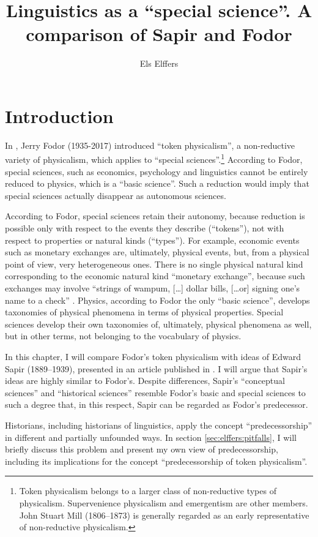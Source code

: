 \documentclass[output=paper]{langscibook}
\author{Els Elffers}
\title{Linguistics as a ``special science''. A comparison of Sapir and Fodor}
\begin{document}
\section{Introduction} 
\label{sec:elffers:intro}
In \citeyear{Fodor1974}, Jerry Fodor (1935-2017) introduced ``token physicalism'', a non-reductive variety of physicalism, which applies to ``special sciences''.\footnote{Token physicalism belongs to a larger class of non-reductive types of physicalism. Supervenience physicalism and emergentism are other members. John Stuart Mill (1806–1873) is generally regarded as an early representative of non-reductive physicalism.} According to Fodor, special sciences, such as economics, psychology and linguistics cannot be entirely reduced to physics, which is a ``basic science''. Such a reduction would imply that special sciences actually disappear as autonomous sciences. 

According to Fodor, special sciences retain their autonomy, because reduction is possible only with respect to the events they describe (``tokens''), not with respect to properties or natural kinds (``types''). For example, economic events such as monetary exchanges are, ultimately, physical events, but, from a physical point of view, very heterogeneous ones. There is no single physical natural kind corresponding to the economic natural kind ``monetary exchange'', because such exchanges may involve ``strings of wampum, […] dollar bills, […or] signing one's name to a check'' \citep[103]{Fodor1974}. Physics, according to Fodor the only ``basic science'', develops taxonomies of physical phenomena in terms of physical properties. Special sciences develop their own taxonomies of, ultimately, physical phenomena as well, but in other terms, not belonging to the vocabulary of physics.

In this chapter, I will compare Fodor's token physicalism with ideas of Edward Sapir (1889–1939), presented in an article published in \citeyear{Sapir1917}. I will argue that Sapir's ideas are highly similar to Fodor's. Despite differences, Sapir's ``conceptual sciences'' and ``historical sciences'' resemble Fodor's basic and special sciences to such a degree that, in this respect, Sapir can be regarded as Fodor's predecessor.\label{q:elffers:probsols}

Historians, including historians of linguistics, apply the concept ``predecessorship'' in different and partially unfounded ways. In section \ref{sec:elffers:pitfalls}, I will briefly discuss this problem and present my own view of predecessorship, including its implications for the concept ``predecessorship of token physicalism''.
\end{document}
